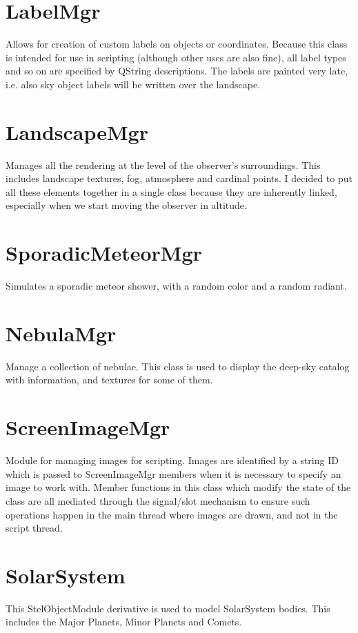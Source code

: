 \section{LabelMgr}
\label{sec:ScriptingAPI:LabelMgr}
Allows for creation of custom labels on objects or coordinates. Because this class is intended for use in scripting (although other uses are also fine), all label types and so on are specified by QString descriptions. The labels are painted very late, i.e. also sky object labels will be written over the landscape.

\section{LandscapeMgr}
\label{sec:ScriptingAPI:LandscapeMgr}
Manages all the rendering at the level of the observer's surroundings. This includes landscape textures, fog, atmosphere and cardinal points. I decided to put all these elements together in a single class because they are inherently linked, especially when we start moving the observer in altitude.

\section{SporadicMeteorMgr}
\label{sec:ScriptingAPI:SporadicMeteorMgr}
Simulates a sporadic meteor shower, with a random color and a random radiant.

\section{NebulaMgr}
\label{sec:ScriptingAPI:NebulaMgr}
Manage a collection of nebulae. This class is used to display the deep-sky catalog with information, and textures for some of them.

\section{ScreenImageMgr}
\label{sec:ScriptingAPI:ScreenImageMgr}
Module for managing images for scripting. Images are identified by a string ID which is passed to ScreenImageMgr members when it is necessary to specify an image to work with. Member functions in this class which modify the state of the class are all mediated through the signal/slot mechanism to ensure such operations happen in the main thread where images are drawn, and not in the script thread.

\section{SolarSystem}
\label{sec:ScriptingAPI:SolarSystem}
This StelObjectModule derivative is used to model SolarSystem bodies. This includes the Major Planets, Minor Planets and Comets.

